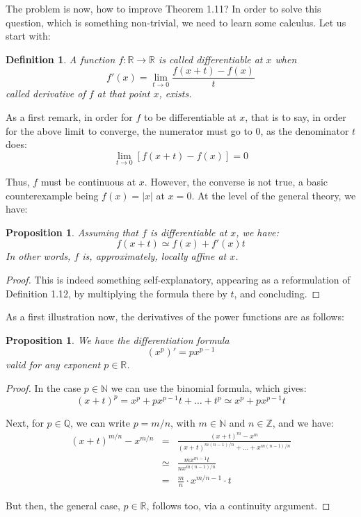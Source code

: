 \documentclass[12pt]{amsbook}
\newtheorem{definition}[theorem]{Definition}
\newtheorem{proposition}[theorem]{Proposition}
\begin{document}
The problem is now, how to improve Theorem 1.11? In order to solve this question, which is something non-trivial, we need to learn some calculus. Let us start with:



\begin{definition}
A function $f:\mathbb R\to\mathbb R$ is called differentiable at $x$ when
$$f'(x)=\lim_{t\to0}\frac{f(x+t)-f(x)}{t}$$
called derivative of $f$ at that point $x$, exists.
\end{definition}

As a first remark, in order for $f$ to be differentiable at $x$, that is to say, in order for the above limit to converge, the numerator must go to $0$, as the denominator $t$ does:
$$\lim_{t\to0}\left[f(x+t)-f(x)\right]=0$$

Thus, $f$ must be continuous at $x$. However, the converse is not true, a basic counterexample being $f(x)=|x|$ at $x=0$. At the level of the general theory, we have:


\begin{proposition}
Assuming that $f$ is differentiable at $x$, we have:
$$f(x+t)\simeq f(x)+f'(x)t$$
In other words, $f$ is, approximately, locally affine at $x$.
\end{proposition}

\begin{proof}
This is indeed something self-explanatory, appearing as a reformulation of Definition 1.12, by multiplying the formula there by $t$, and concluding.
\end{proof}

As a first illustration now, the derivatives of the power functions are as follows:

\begin{proposition}
We have the differentiation formula
$$(x^p)'=px^{p-1}$$
valid for any exponent $p\in\mathbb R$.
\end{proposition}

\begin{proof}
In the case $p\in\mathbb N$ we can use the binomial formula, which gives:
$$(x+t)^p
=x^p+px^{p-1}t+\ldots+t^p
\simeq x^p+px^{p-1}t$$

Next, for $p\in\mathbb Q$, we can write $p=m/n$, with $m\in\mathbb N$ and $n\in\mathbb Z$, and we have: 
\begin{eqnarray*}
(x+t)^{m/n}-x^{m/n}
&=&\frac{(x+t)^m-x^m}{(x+t)^{m(n-1)/n}+\ldots+x^{m(n-1)/n}}\\
&\simeq&\frac{mx^{m-1}t}{nx^{m(n-1)/n}}\\
&=&\frac{m}{n}\cdot x^{m/n-1}\cdot t
\end{eqnarray*}

But then, the general case, $p\in\mathbb R$, follows too, via a continuity argument.
\end{proof}
\end{document}
